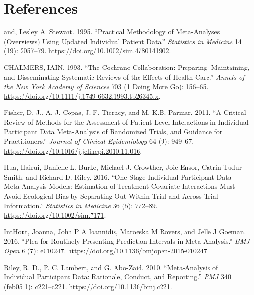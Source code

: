 \documentclass[]{article}
\begin{document}
\newpage

\hypertarget{references}{%
\section*{References}\label{references}}

\hypertarget{refs}{}
\leavevmode\hypertarget{ref-Stewart_1995}{}%
and, Lesley A. Stewart. 1995. ``Practical Methodology of Meta-Analyses
(Overviews) Using Updated Individual Patient Data.'' \emph{Statistics in
Medicine} 14 (19): 2057--79.
\url{https://doi.org/10.1002/sim.4780141902}.

\leavevmode\hypertarget{ref-CHALMERS_1993}{}%
CHALMERS, IAIN. 1993. ``The Cochrane Collaboration: Preparing,
Maintaining, and Disseminating Systematic Reviews of the Effects of
Health Care.'' \emph{Annals of the New York Academy of Sciences} 703 (1
Doing More Go): 156--65.
\url{https://doi.org/10.1111/j.1749-6632.1993.tb26345.x}.

\leavevmode\hypertarget{ref-Fisher_2011}{}%
Fisher, D. J., A. J. Copas, J. F. Tierney, and M. K.B. Parmar. 2011. ``A
Critical Review of Methods for the Assessment of Patient-Level
Interactions in Individual Participant Data Meta-Analysis of Randomized
Trials, and Guidance for Practitioners.'' \emph{Journal of Clinical
Epidemiology} 64 (9): 949--67.
\url{https://doi.org/10.1016/j.jclinepi.2010.11.016}.

\leavevmode\hypertarget{ref-Hua_2016}{}%
Hua, Hairui, Danielle L. Burke, Michael J. Crowther, Joie Ensor, Catrin
Tudur Smith, and Richard D. Riley. 2016. ``One-Stage Individual
Participant Data Meta-Analysis Models: Estimation of Treatment-Covariate
Interactions Must Avoid Ecological Bias by Separating Out Within-Trial
and Across-Trial Information.'' \emph{Statistics in Medicine} 36 (5):
772--89. \url{https://doi.org/10.1002/sim.7171}.

\leavevmode\hypertarget{ref-IntHout_2016}{}%
IntHout, Joanna, John P A Ioannidis, Maroeska M Rovers, and Jelle J
Goeman. 2016. ``Plea for Routinely Presenting Prediction Intervals in
Meta-Analysis.'' \emph{BMJ Open} 6 (7): e010247.
\url{https://doi.org/10.1136/bmjopen-2015-010247}.

\leavevmode\hypertarget{ref-Riley_2010}{}%
Riley, R. D., P. C. Lambert, and G. Abo-Zaid. 2010. ``Meta-Analysis of
Individual Participant Data: Rationale, Conduct, and Reporting.''
\emph{BMJ} 340 (feb05 1): c221--c221.
\url{https://doi.org/10.1136/bmj.c221}.
\end{document}
